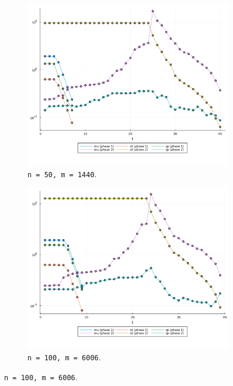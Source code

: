 \documentclass[10pt,a4paper]{article}
\begin{document}
\begin{figure}
\centering

\begin{subfigure}[b]{0.49\textwidth}
\includegraphics[width=\textwidth]{plots/ng_50_2228_17_5_97.dimacs.log.png}
\caption{\texttt{n = 50, m = 1440}.}
\end{subfigure}
\hfill
\begin{subfigure}[b]{0.49\textwidth}
\includegraphics[width=\textwidth]{plots/ng_100_8813_33_9_97.dimacs.log.png}
\caption{\texttt{n = 100, m = 6006}.}
\end{subfigure}


\end{figure}
\end{document}
